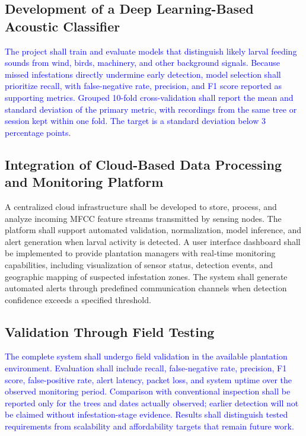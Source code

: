 \documentclass[12pt,a4paper,oneside]{memoir}
\newcommand{\earlierrevision}[1]{\textcolor{blue}{#1}}
\begin{document}
 
\subsection{Development of a Deep Learning-Based Acoustic Classifier}
 
\earlierrevision{The project shall train and evaluate models that distinguish likely larval feeding sounds from wind, birds, machinery, and other background signals. Because missed infestations directly undermine early detection, model selection shall prioritize recall, with false-negative rate, precision, and F1 score reported as supporting metrics. Grouped 10-fold cross-validation shall report the mean and standard deviation of the primary metric, with recordings from the same tree or session kept within one fold. The target is a standard deviation below 3 percentage points.}
 
 
\subsection{Integration of Cloud-Based Data Processing and Monitoring Platform}
 
A centralized cloud infrastructure shall be developed to store, process, and analyze incoming MFCC feature streams transmitted by sensing nodes. The platform shall support automated validation, normalization, model inference, and alert generation when larval activity is detected. A user interface dashboard shall be implemented to provide plantation managers with real-time monitoring capabilities, including visualization of sensor status, detection events, and geographic mapping of suspected infestation zones. The system shall generate automated alerts through predefined communication channels when detection confidence exceeds a specified threshold.
 
\subsection{Validation Through Field Testing}
 
\earlierrevision{The complete system shall undergo field validation in the available plantation environment. Evaluation shall include recall, false-negative rate, precision, F1 score, false-positive rate, alert latency, packet loss, and system uptime over the observed monitoring period. Comparison with conventional inspection shall be reported only for the trees and dates actually observed; earlier detection will not be claimed without infestation-stage evidence. Results shall distinguish tested requirements from scalability and affordability targets that remain future work.}
 
\end{document}
